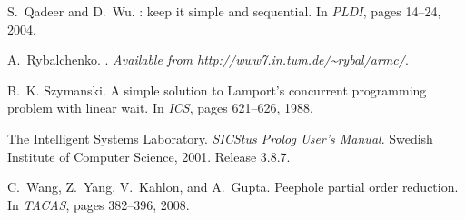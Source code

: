 \documentclass{sigplanconf}
\begin{document}
\begin{thebibliography}{34}
S.~Qadeer and D.~Wu.
: keep it simple and sequential.
\newblock In \emph{PLDI}, pages 14--24, 2004.

A.~Rybalchenko.
.
\newblock \emph{Available from http://www7.in.tum.de/\~{}rybal/armc/}.

B.~K. Szymanski.
\newblock A simple solution to {L}amport's concurrent programming problem with
  linear wait.
\newblock In \emph{ICS}, pages 621--626, 1988.

{The Intelligent Systems Laboratory}.
\newblock \emph{SICStus Prolog User's Manual}.
\newblock Swedish Institute of Computer Science, 2001.
\newblock Release 3.8.7.

C.~Wang, Z.~Yang, V.~Kahlon, and A.~Gupta.
\newblock Peephole partial order reduction.
\newblock In \emph{TACAS}, pages 382--396, 2008.

\end{thebibliography}



\iffalse
\appendix
% 
% 
% 
% 

\clearpage






\fi
%
\end{document}
